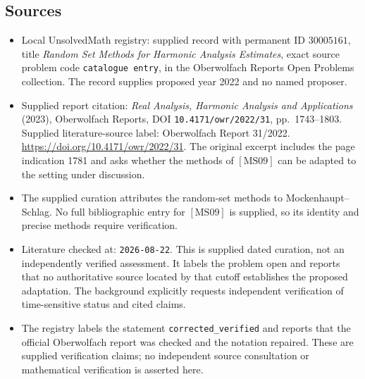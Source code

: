 \documentclass[11pt]{article}
\begin{document}
\subsection{Sources}
\begin{itemize}
\item Local UnsolvedMath registry: supplied record with permanent ID \(30005161\), title \emph{Random Set Methods for Harmonic Analysis Estimates}, exact source problem code \texttt{catalogue entry}, in the Oberwolfach Reports Open Problems collection. The record supplies proposed year 2022 and no named proposer.
\item Supplied report citation: \emph{Real Analysis, Harmonic Analysis and Applications} (2023), Oberwolfach Reports, DOI \texttt{10.4171/owr/2022/31}, pp.~1743--1803. Supplied literature-source label: Oberwolfach Report 31/2022. \url{https://doi.org/10.4171/owr/2022/31}. The original excerpt includes the page indication 1781 and asks whether the methods of \([\mathrm{MS09}]\) can be adapted to the setting under discussion.
\item The supplied curation attributes the random-set methods to Mockenhaupt--Schlag. No full bibliographic entry for \([\mathrm{MS09}]\) is supplied, so its identity and precise methods require verification.
\item Literature checked at: \texttt{2026-08-22}. This is supplied dated curation, not an independently verified assessment. It labels the problem open and reports that no authoritative source located by that cutoff establishes the proposed adaptation. The background explicitly requests independent verification of time-sensitive status and cited claims.
\item The registry labels the statement \texttt{corrected\_verified} and reports that the official Oberwolfach report was checked and the notation repaired. These are supplied verification claims; no independent source consultation or mathematical verification is asserted here.
\end{itemize}
\end{document}
